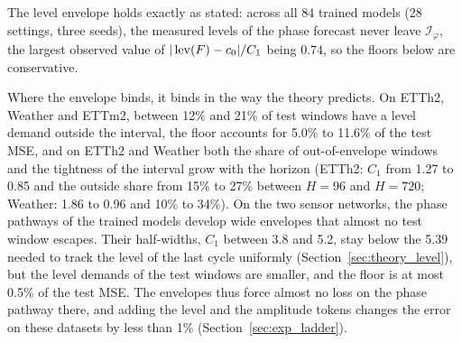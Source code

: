 {\begin{table}[t]
\end{table}

 The level envelope holds exactly as stated: across all 84 trained models (28 settings, three seeds), the measured levels of the phase forecast never leave $\mathcal I_\varphi$, the largest observed value of $|\operatorname{lev}(F)-c_0|/C_1$ being $0.74$, so the floors below are conservative.

 Where the envelope binds, it binds in the way the theory predicts. On ETTh2, Weather and ETTm2, between 12\% and 21\% of test windows have a level demand outside the interval, the floor accounts for 5.0\% to 11.6\% of the test MSE, and on ETTh2 and Weather both the share of out-of-envelope windows and the tightness of the interval grow with the horizon (ETTh2: $C_1$ from 1.27 to 0.85 and the outside share from 15\% to 27\% between $H=96$ and $H=720$; Weather: 1.86 to 0.96 and 10\% to 34\%). On the two sensor networks, the phase pathways of the trained models develop wide envelopes that almost no test window escapes. Their half-widths, $C_1$ between 3.8 and 5.2, stay below the 5.39 needed to track the level of the last cycle uniformly (Section~\ref{sec:theory_level}), but the level demands of the test windows are smaller, and the floor is at most 0.5\% of the test MSE. The envelopes thus force almost no loss on the phase pathway there, and adding the level and the amplitude tokens changes the error on these datasets by less than 1\% (Section~\ref{sec:exp_ladder}).

}
